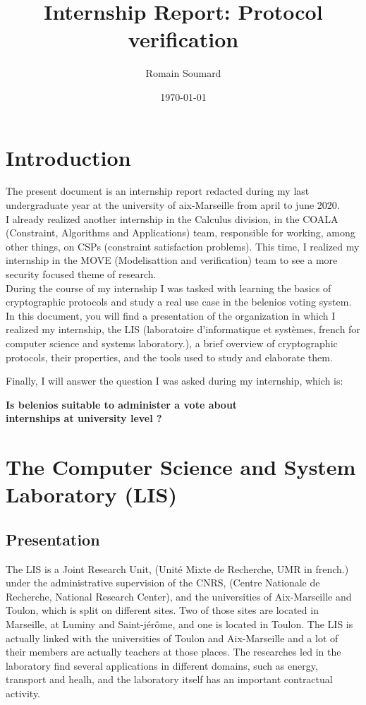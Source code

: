 \documentclass[12pt, a4paper]{report}
\title{\color{blue}Internship Report: Protocol verification}
\author{Romain Soumard}
\date{\today}
\begin{document}
\maketitle
\tableofcontents
\newpage
\section{Introduction}

The present document is an internship report redacted during my last undergraduate year at the university of aix-Marseille from april to june 2020.\\ 

I already realized another internship in the Calculus division, in the COALA (Constraint, Algorithms and Applications) team, responsible for working, among other things, on CSPs (constraint satisfaction problems). This time, I realized my internship in the MOVE (Modelisattion and verification) team to see a more security focused theme of research.\\

During the course of my internship I was tasked with learning the basics of cryptographic protocols and study a real use case in the belenios voting system.
In this document, you will find a presentation of the organization in which I realized my internship, the LIS (laboratoire d'informatique et systèmes, french for computer science and systems laboratory.), a brief overview of cryptographic protocols, their properties, and the tools used to study and elaborate them.

Finally, I will answer the question I was asked during my internship, which is:\\

\begin{center}
\textbf{Is belenios suitable to administer a vote about\\ internships at university level ?}

\end{center}
 

\section{The Computer Science and System Laboratory (LIS)}

\subsection{Presentation}

The LIS is a Joint Research Unit, (Unité Mixte de Recherche, UMR in french.) under the administrative supervision of the CNRS, (Centre Nationale de Recherche, National Research Center), and the universities of Aix-Marseille and Toulon, which is split on different sites.
Two of those sites are located in Marseille, at Luminy and Saint-jérôme, and one is located in Toulon.
The LIS is actually linked with the universities of Toulon and Aix-Marseille and a lot of their members are actually teachers at those places.
The researches led in the laboratory find several applications in different domains, such as energy, transport and healh, and the laboratory itself has an important contractual activity.
\end{document}
